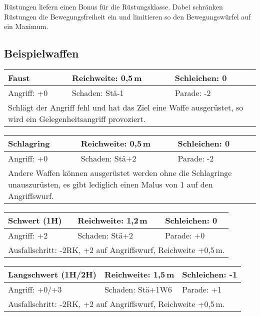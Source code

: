 \documentclass[../../Heldenanleitung2]{subfiles}
\begin{document}
Rüstungen liefern einen Bonus für die Rüstungsklasse. Dabei schränken Rüstungen die Bewegungsfreiheit ein und limitieren so den Bewegungswürfel auf ein Maximum.

\subsection{Beispielwaffen}

\begin{tabular}{|p{}|p{}|p{}|}
\hline
\textbf{Faust} & Reichweite: 0,5\,m & Schleichen: 0 \\
\hline
Angriff: +0 & Schaden: Stä-1 & Parade: -2\\
\hline
\multicolumn{3}{|p{0.99\textwidth}|}{Schlägt der Angriff fehl und hat das Ziel eine Waffe ausgerüstet, so wird ein Gelegenheitsangriff provoziert.} \\
\hline
\end{tabular}
\newline \newline\newline
\begin{tabular}{|p{}|p{}|p{}|}
\hline
\textbf{Schlagring} & Reichweite: 0,5\,m & Schleichen: 0\\
\hline
Angriff: +0 & Schaden: Stä+2 & Parade: -2 \\
\hline
\multicolumn{3}{|p{0.99\textwidth}|}{Andere Waffen können ausgerüstet werden ohne die Schlagringe unauszurüsten, es gibt lediglich einen Malus von 1 auf den Angriffswurf.} \\
\hline
\end{tabular}
\newline \newline\newline
\begin{tabular}{|p{}|p{}|p{}|}
\hline
\textbf{Schwert (1H)} & Reichweite: 1,2\,m & Schleichen: 0\\
\hline
Angriff: +2 & Schaden: Stä+2 & Parade: +0\\
\hline
\multicolumn{3}{|p{0.99\textwidth}|}{Ausfallschritt: -2RK, +2 auf Angriffswurf, Reichweite +0,5\,m.} \\
\hline
\end{tabular}
\newline \newline\newline
\begin{tabular}{|p{}|p{}|p{}|}
\hline
\textbf{Langschwert (1H/2H)} & Reichweite: 1,5\,m & Schleichen: -1 \\
\hline
Angriff: +0/+3 & Schaden: Stä+1W6 & Parade: +1\\
\hline
\multicolumn{3}{|p{0.99\textwidth}|}{Ausfallschritt: -2RK, +2 auf Angriffswurf, Reichweite +0,5\,m.} \\
\hline
\end{tabular}
\end{document}
